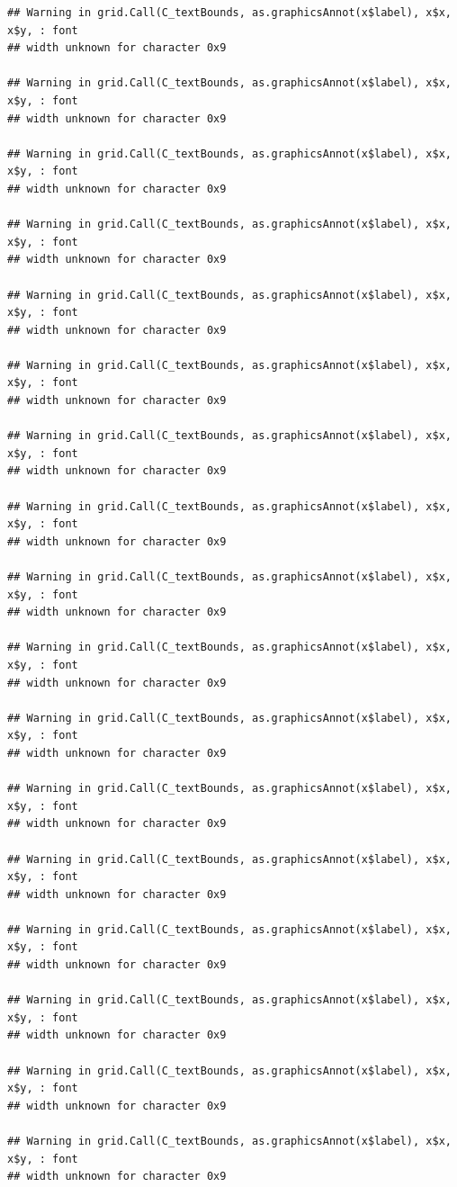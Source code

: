 \documentclass[
]{article}
\begin{document}
\begin{verbatim}
## Warning in grid.Call(C_textBounds, as.graphicsAnnot(x$label), x$x, x$y, : font
## width unknown for character 0x9

## Warning in grid.Call(C_textBounds, as.graphicsAnnot(x$label), x$x, x$y, : font
## width unknown for character 0x9

## Warning in grid.Call(C_textBounds, as.graphicsAnnot(x$label), x$x, x$y, : font
## width unknown for character 0x9

## Warning in grid.Call(C_textBounds, as.graphicsAnnot(x$label), x$x, x$y, : font
## width unknown for character 0x9

## Warning in grid.Call(C_textBounds, as.graphicsAnnot(x$label), x$x, x$y, : font
## width unknown for character 0x9

## Warning in grid.Call(C_textBounds, as.graphicsAnnot(x$label), x$x, x$y, : font
## width unknown for character 0x9

## Warning in grid.Call(C_textBounds, as.graphicsAnnot(x$label), x$x, x$y, : font
## width unknown for character 0x9

## Warning in grid.Call(C_textBounds, as.graphicsAnnot(x$label), x$x, x$y, : font
## width unknown for character 0x9

## Warning in grid.Call(C_textBounds, as.graphicsAnnot(x$label), x$x, x$y, : font
## width unknown for character 0x9

## Warning in grid.Call(C_textBounds, as.graphicsAnnot(x$label), x$x, x$y, : font
## width unknown for character 0x9

## Warning in grid.Call(C_textBounds, as.graphicsAnnot(x$label), x$x, x$y, : font
## width unknown for character 0x9

## Warning in grid.Call(C_textBounds, as.graphicsAnnot(x$label), x$x, x$y, : font
## width unknown for character 0x9

## Warning in grid.Call(C_textBounds, as.graphicsAnnot(x$label), x$x, x$y, : font
## width unknown for character 0x9

## Warning in grid.Call(C_textBounds, as.graphicsAnnot(x$label), x$x, x$y, : font
## width unknown for character 0x9

## Warning in grid.Call(C_textBounds, as.graphicsAnnot(x$label), x$x, x$y, : font
## width unknown for character 0x9

## Warning in grid.Call(C_textBounds, as.graphicsAnnot(x$label), x$x, x$y, : font
## width unknown for character 0x9

## Warning in grid.Call(C_textBounds, as.graphicsAnnot(x$label), x$x, x$y, : font
## width unknown for character 0x9


\end{verbatim}
\end{document}
